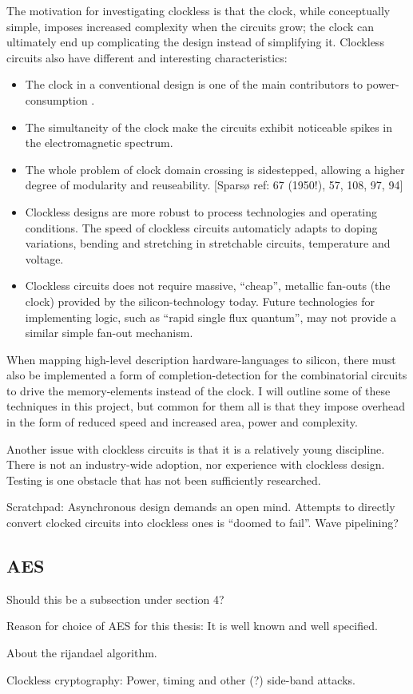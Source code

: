 The motivation for investigating clockless is that the clock, while
conceptually simple, imposes increased complexity when the circuits
grow; the clock can ultimately end up complicating the design instead
of simplifying it. Clockless circuits also have different and
interesting characteristics: \begin{itemize}

\item The clock in a conventional design is one of the main
  contributors to power-consumption \cite{tiwari1998reducing}.

\item The simultaneity of the clock make the circuits exhibit
  noticeable spikes in the electromagnetic spectrum.

\item The whole problem of clock domain crossing is sidestepped,
  allowing a higher degree of modularity and reuseability. [Sparsø
    ref: 67 (1950!), 57, 108, 97, 94]

\item Clockless designs are more robust to process technologies and
  operating conditions. The speed of clockless circuits automaticly
  adapts to doping variations, bending and stretching in stretchable
  circuits, temperature and voltage.

\item Clockless circuits does not require massive, ``cheap'', metallic
  fan-outs (the clock) provided by the silicon-technology today. Future
  technologies for implementing logic, such as ``rapid single flux
  quantum'', may not provide a similar simple fan-out mechanism.
\end{itemize}

When mapping high-level description hardware-languages to silicon,
there must also be implemented a form of completion-detection for the
combinatorial circuits to drive the memory-elements instead of the
clock. I will outline some of these techniques in this project, but
common for them all is that they impose overhead in the form of
reduced speed and increased area, power and complexity.

Another issue with clockless circuits is that it is a relatively young
discipline. There is not an industry-wide adoption, nor experience
with clockless design. Testing is one obstacle that has not been
sufficiently researched. 

Scratchpad: Asynchronous design demands an open mind. Attempts to
directly convert clocked circuits into clockless ones is ``doomed to
fail''. Wave pipelining?

\subsection{AES}

Should this be a subsection under section 4?

Reason for choice of AES for this thesis: It is well known and well specified.

About the rijandael algorithm.

Clockless cryptography: Power, timing and other (?) side-band attacks.

